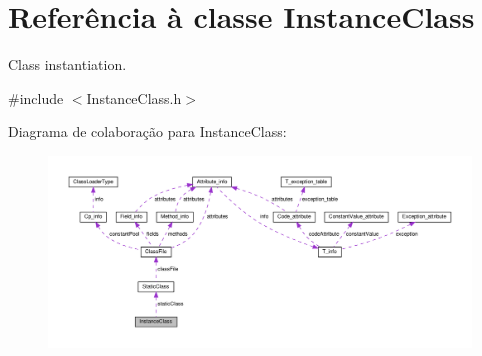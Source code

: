 \hypertarget{classInstanceClass}{}\section{Referência à classe Instance\+Class}
\label{classInstanceClass}


Class instantiation.  




{\ttfamily \#include $<$Instance\+Class.\+h$>$}



Diagrama de colaboração para Instance\+Class\+:\nopagebreak
\begin{figure}[H]
\begin{center}
\leavevmode
\includegraphics[width=350pt]{classInstanceClass__coll__graph}
\end{center}
\end{figure}
